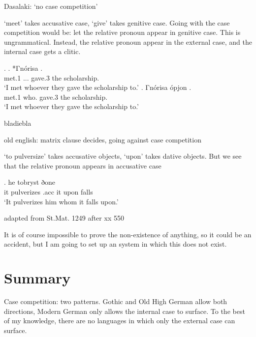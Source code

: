 Dasalaki: `no case competition'

`meet' takes accusative case, `give' takes genitive case. Going with the case competition would be: let the relative pronoun appear in genitive case. This is ungrammatical. Instead, the relative pronoun appear in the external case, and the internal case gets a clitic.

\ex.
\ag. *Γnórisa    .\\
met.1 ... gave.3 the scholarship.\\
`I met whoever they gave the scholarship to.'
\bg. Γnórisa ópjon    .\\
met.1 who.  gave.3 the scholarship.\\
`I met whoever they gave the scholarship to.'

bladiebla \citep{harbert1983}

old english: matrix clause decides, going against case competition

 `to pulversize' takes accusative objects,  `upon' takes dative objects. But we see that the relative pronoun appears in accusative case

\exg. he tobryst ðone    \\
 it pulverizes\scsub{[acc]} .\ac{acc}  it upon\scsub{[dat]} falls\\
`It pulverizes him whom it falls upon.' \label{ex:old-english}

 adapted from St.Mat. 1249 after xx  550

It is of course impossible to prove the non-existence of anything, so it could be an accident, but I am going to set up an system in which this does not exist.


\section{Summary}

Case competition: two patterns. Gothic and Old High German allow both directions, Modern German only allows the internal case to surface. To the best of my knowledge, there are no languages in which only the external case can surface.
